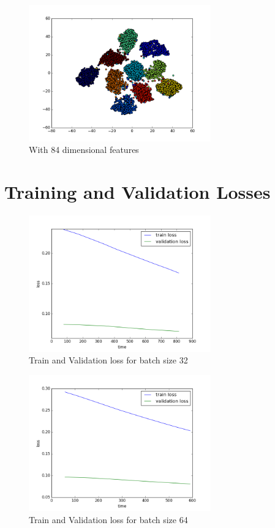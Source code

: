 \documentclass{article}
\begin{document}
\begin{figure}[h]
  \centering
  \includegraphics[width=0.7\textwidth]{keras_lenet/scatter_encoding.png}
  \caption{With 84 dimensional features}
\end{figure}

\section{Training and Validation Losses}

\begin{figure}[h]
  \centering
  \includegraphics[width=0.7\textwidth]{keras_lenet/loss32.png}
  \caption{Train and Validation loss for batch size 32}
\end{figure}

\begin{figure}[h]
  \centering
  \includegraphics[width=0.7\textwidth]{keras_lenet/loss64.png}
  \caption{Train and Validation loss for batch size 64}
\end{figure}
\end{document}
